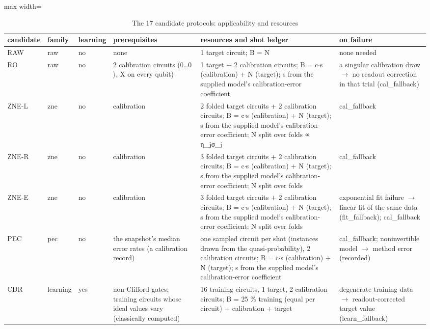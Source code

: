 \begin{table}[htbp]
\centering
\footnotesize
\setlength{\tabcolsep}{3.0pt}
\caption{The 17 candidate protocols: applicability and resources}
\label{tab:qem190-candidates}
\begin{adjustbox}{max width=\textwidth}\begin{tabular}{lllp{3.6cm}p{4.6cm}p{3.4cm}}
\toprule
candidate & family & learning & prerequisites & resources and shot ledger & on failure \\
\midrule
RAW & raw & no & none & 1 target circuit; B = N & none needed \\
RO & raw & no & 2 calibration circuits (\textbar{}0…0$\rangle$, X on every qubit) & 1 target + 2 calibration circuits; B = c$\cdot$s (calibration) + N (target); s from the supplied model's calibration-error coefficient & a singular calibration draw $\to$ no readout correction in that trial (cal\_fallback) \\
ZNE-L & zne & no & calibration & 2 folded target circuits + 2 calibration circuits; B = c$\cdot$s (calibration) + N (target); s from the supplied model's calibration-error coefficient; N split over folds ∝ \textbar{}η\_j\textbar{}σ\_j & cal\_fallback \\
ZNE-R & zne & no & calibration & 3 folded target circuits + 2 calibration circuits; B = c$\cdot$s (calibration) + N (target); s from the supplied model's calibration-error coefficient; N split over folds & cal\_fallback \\
ZNE-E & zne & no & calibration & 3 folded target circuits + 2 calibration circuits; B = c$\cdot$s (calibration) + N (target); s from the supplied model's calibration-error coefficient; N split over folds & exponential fit failure $\to$ linear fit of the same data (fit\_fallback); cal\_fallback \\
PEC & pec & no & the snapshot's median error rates (a calibration record) & one sampled circuit per shot (instances drawn from the quasi-probability), 2 calibration circuits; B = c$\cdot$s (calibration) + N (target); s from the supplied model's calibration-error coefficient & cal\_fallback; noninvertible model $\to$ method error (recorded) \\
CDR & learning & yes & non-Clifford gates; training circuits whose ideal values vary (classically computed) & 16 training circuits, 1 target, 2 calibration circuits; B = 25 \% training (equal per circuit) + calibration + target & degenerate training data $\to$ readout-corrected target value (learn\_fallback) \\

\end{tabular}
\end{adjustbox}
\end{table}
